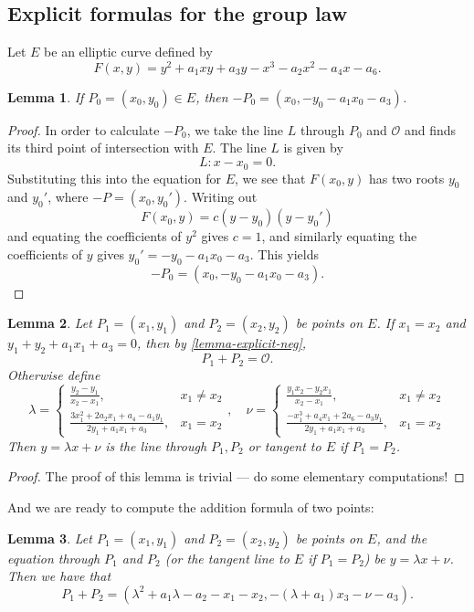 \documentclass[12pt]{article}
\newtheorem{lemma}{Lemma}[subsection]
\theoremstyle{remark}
\theoremstyle{definition}
\newcommand{\ecO}[0]{\mathcal O}
\begin{document}
    \subsection{Explicit formulas for the group law}
        Let $E$ be an elliptic curve defined by $$F(x, y)=y^2+a_1xy+a_3y-x^3-a_2x^2-a_4x-a_6.$$
    \begin{lemma}\label{lemma-explicit-neg}
        If $P_0=(x_0, y_0)\in E$, then $-P_0=(x_0, -y_0-a_1x_0-a_3)$.
    \end{lemma}
    \begin{proof}
        In order to calculate $-P_0$, we take the line $L$ through $P_0$ and $\ecO$ and finds its third point of intersection with $E$. The line $L$ is given by $$L:x-x_0=0.$$
        Substituting this into the equation for $E$, we see that $F(x_0,y)$ has two roots $y_0$ and $y_0'$, where $-P=(x_0,y_0')$. Writing out $$F(x_0,y)=c(y-y_0)(y-y_0')$$ and equating the coefficients of $y^2$ gives $c=1$, and similarly equating the coefficients of $y$ gives $y_0'=-y_0-a_1x_0-a_3$. This yields $$-P_0=(x_0, -y_0-a_1x_0-a_3).$$
    \end{proof}
    \begin{lemma}
        Let $P_1=(x_1,y_1)$ and $P_2=(x_2,y_2)$ be points on $E$. If $x_1=x_2$ and $y_1+y_2+a_1x_1+a_3=0$, then by \autoref{lemma-explicit-neg},
        $$P_1+P_2=\ecO.$$
        Otherwise define
        \[\lambda =
        \begin{cases}
            \frac{y_2-y_1}{x_2-x_1}, & x_1\neq x_2\\
            \frac{3x_1^2+2a_2x_1+a_4-a_1y_1}{2y_1+a_1x_1+a_3} , & x_1=x_2
        \end{cases},\quad\nu=\begin{cases}
            \frac{y_1x_2-y_2x_1}{x_2-x_1}, & x_1\neq x_2\\
            \frac{-x_1^3+a_4x_1+2a_6-a_3y_1}{2y_1+a_1x_1+a_3}, & x_1=x_2
        \end{cases}\]
        Then $y=\lambda x+\nu$ is the line through $P_1,P_2$ or tangent to $E$ if $P_1=P_2$.
    \end{lemma}
    \begin{proof}
        The proof of this lemma is trivial --- do some elementary computations!
    \end{proof}
    And we are ready to compute the addition formula of two points:
    \begin{lemma}
        Let $P_1=(x_1,y_1)$ and $P_2=(x_2,y_2)$ be points on $E$, and the equation through $P_1$ and $P_2$ (or the tangent line to $E$ if $P_1=P_2$) be $y=\lambda x+\nu $. Then we have that $$P_1+P_2=(\lambda ^2 +a_1\lambda -a_2-x_1-x_2,-(\lambda +a_1)x_3-\nu -a_3).$$
    \end{lemma}
\end{document}
